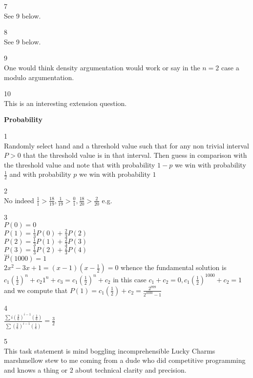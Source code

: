 7 \\
See 9 below.

8 \\
See 9 below.

9 \\
One would think density argumentation would work or say in the $n=2$ case a modulo argumentation.

10 \\
This is an interesting extension question.

\newpage

\textbf{Probability}

1 \\
Randomly select hand and a threshold value such that for any non trivial interval $P>0$ that the threshold value is in that interval. Then guess in comparison with the threshold value and note that with probability $1-p$ we win with probability $\frac{1}{2}$ and with probability $p$ we win with probability $1$

2 \\
$\boxed{\text{No}}$ indeed $\frac{1}{1}>\frac{18}{19},\frac{1}{19}>\frac{0}{1},\frac{18}{20}>\frac{2}{20}$ e.g.

3 \\
$P(0)=0$ \\
$P(1)=\frac{1}{3}P(0)+\frac{2}{3}P(2)$ \\
$P(2)=\frac{1}{3}P(1)+\frac{2}{3}P(3)$ \\
$P(3)=\frac{1}{3}P(2)+\frac{2}{3}P(4)$ \\
$\dots$ \\
$P(1000)=1$ \\
$2x^2-3x+1=(x-1)(x-\frac{1}{2})=0$ whence the fundamental solution is $c_1 \left(\frac{1}{2} \right)^n + c_2 1^n + c_3 = c_1 \left(\frac{1}{2} \right)^n + c_2$ in this case $c_1+c_2=0,c_1 \left(\frac{1}{2} \right)^{1000}+c_2=1$ and we compute that $P(1)=c_1 \left(\frac{1}{2} \right)+c_2=\boxed{\frac{2^{999}}{2^{1000}-1}}$

4 \\
$\frac{\sum i\left(\frac{2}{6}\right)^{i-1}\left(\frac{1}{6}\right)}{\sum \left(\frac{2}{6}\right)^{i-1}\left(\frac{1}{6}\right)}=\boxed{\frac{3}{2}}$

5 \\
This task statement is mind boggling incomprehensible Lucky Charms marshmellow stew to me coming from a dude who did competitive programming and knows a thing or $2$ about technical clarity and precision.

\newpage


